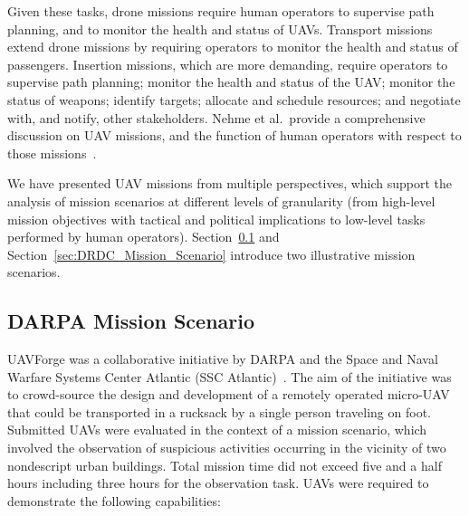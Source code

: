 Given these tasks, drone missions require human operators to supervise path planning, and to monitor the health and status of UAVs. Transport missions extend drone missions by requiring operators to monitor the health and status of passengers. Insertion missions, which are more demanding, require operators to supervise path planning; monitor the health and status of the UAV; monitor the status of weapons; identify targets; allocate and schedule resources; and negotiate with, and notify, other stakeholders. Nehme et al.\ provide a comprehensive discussion on UAV missions, and the function of human operators with respect to those missions~\cite{Nehme_2006}.

We have presented UAV missions from multiple perspectives, which support the analysis of mission scenarios at different levels of granularity (from high-level mission objectives with tactical and political implications to low-level tasks performed by human operators). Section~\ref{sec:DARPA_Mission_Scenario} and Section~\ref{sec:DRDC_Mission_Scenario} introduce two illustrative mission scenarios.

\subsection{DARPA Mission Scenario}
\label{sec:DARPA_Mission_Scenario}

UAVForge was a collaborative initiative by DARPA and the Space and Naval Warfare Systems Center Atlantic (SSC Atlantic)~\cite{DARPA}. The aim of the initiative was to crowd-source the design and development of a remotely operated micro-UAV that could be transported in a rucksack by a single person traveling on foot. Submitted UAVs were evaluated in the context of a mission scenario, which involved the observation of suspicious activities occurring in the vicinity of two nondescript urban buildings. Total mission time did not exceed five and a half hours including three hours for the observation task. UAVs were required to demonstrate the following capabilities:

